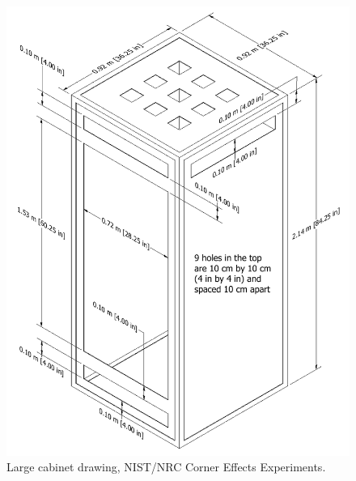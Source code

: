 \begin{figure}[p]
\includegraphics[width=\textwidth]{FIGURES/NIST_NRC_Corner_Effects/Cabinet_3x3x7}
\caption[Large cabinet drawing, NIST/NRC Corner Effects Experiments]{Large cabinet drawing, NIST/NRC Corner Effects Experiments.}
\label{Large_Cabinet}
\end{figure}

